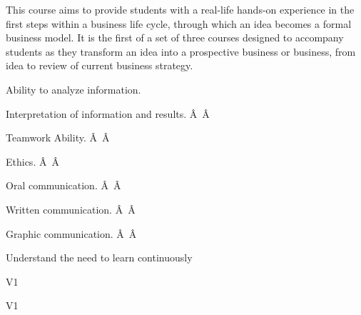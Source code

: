 \begin{syllabus}


\begin{justification}
This course aims to provide students with a real-life hands-on experience in the first steps within a business life cycle, through which an idea becomes a formal business model.
It is the first of a set of three courses designed to accompany students as they transform an idea into a prospective business or business, from idea to review of current business strategy.
\end{justification}

\begin{goals}
   \item Ability to analyze information.
   \item Interpretation of information and results.
Â Â  \item Teamwork Ability.
Â Â  \item Ethics.
Â Â  \item Oral communication.
Â Â  \item Written communication.
Â Â  \item Graphic communication.
Â Â  \item Understand the need to learn continuously
\end{goals}

\begin{outcomes}{V1}
    \item {} %
    \item {} %
    \item {} %
    \item {} %
    \item {} %
\end{outcomes}

\begin{competences}{V1}
    \item {}
    \item {}
    \item {}
\end{competences}


\end{syllabus}
